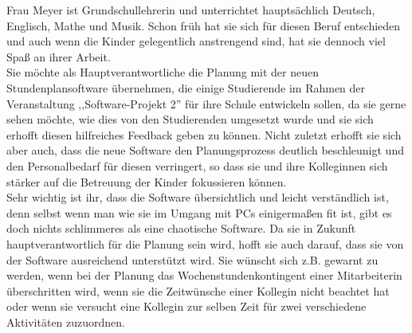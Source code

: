 \documentclass[fontsize=12pt,paper=a4,twoside]{scrartcl}
\begin{document}
Frau Meyer ist Grundschullehrerin und unterrichtet hauptsächlich Deutsch, Englisch, Mathe und Musik. Schon früh hat sie sich für diesen Beruf entschieden und auch wenn die Kinder gelegentlich anstrengend sind, hat sie dennoch viel Spaß an ihrer Arbeit.\\
Sie möchte als Hauptverantwortliche die Planung mit der neuen Stundenplansoftware übernehmen, die einige Studierende im Rahmen der Veranstaltung ,,Software-Projekt 2'' für ihre Schule entwickeln sollen, da sie gerne sehen möchte, wie dies von den Studierenden umgesetzt wurde und sie sich erhofft diesen hilfreiches Feedback geben zu können. Nicht zuletzt erhofft sie sich aber auch, dass die neue Software den Planungsprozess deutlich beschleunigt und den Personalbedarf für diesen verringert, so dass sie und ihre Kolleginnen sich stärker auf die Betreuung der Kinder fokussieren können.  \\
Sehr wichtig ist ihr, dass die Software übersichtlich und leicht verständlich ist, denn selbst wenn man wie sie im Umgang mit PCs einigermaßen fit ist, gibt es doch nichts schlimmeres als eine chaotische Software. Da sie in Zukunft hauptverantwortlich für die Planung sein wird, hofft sie auch darauf, dass sie von der Software ausreichend unterstützt wird. Sie wünscht sich z.B. gewarnt zu werden, wenn bei der Planung das Wochenstundenkontingent einer Mitarbeiterin überschritten wird, wenn sie die Zeitwünsche einer Kollegin nicht beachtet hat oder wenn sie versucht eine Kollegin zur selben Zeit für zwei verschiedene Aktivitäten zuzuordnen. \\
\end{document}
